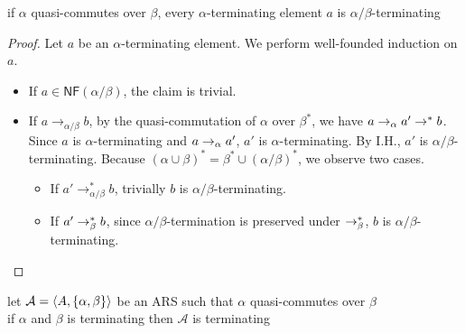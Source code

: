 \documentclass[12pt,aspectratio=169]{beamer}
\begin{document}
\newcommand{\abto}{\to_{\alpha/\beta}}

\begin{frame}
    \frametitle{}
    \begin{lemma}
        if $\alpha$ quasi-commutes over $\beta$,
        every $\alpha$-terminating element $a$ is $\alpha/\beta$-terminating
    \end{lemma}
    \pause
    \begin{proof}
        Let $a$ be an $\alpha$-terminating element.
        \pause
        We perform well-founded induction on $a$.
        \pause
        \begin{itemize}
            \item If $a \in \mathsf{NF}(\alpha/\beta)$, the claim is trivial.
            \pause
            \item If $a \abto b$, by the quasi-commutation of $\alpha$ over $\beta^*$, we have
            $a \to_{\alpha} a' \to^* b$.
            \pause Since $a$ is $\alpha$-terminating and $a \to_{\alpha} a'$,
            $a'$ is $\alpha$-terminating.
            \pause By I.H., $a'$ is $\alpha/\beta$-terminating.
            \pause
            Because $(\alpha \cup \beta)^* = \beta^* \cup (\alpha/\beta)^*$,
            we observe two cases.
            \begin{itemize}
                \pause
                \item If $a' \abto^* b$, trivially $b$ is $\alpha/\beta$-terminating.
                \pause
                \item If $a' \to_{\beta}^* b$, since $\alpha/\beta$-termination is preserved under $\to_{\beta}^*$,
                    $b$ is $\alpha/\beta$-terminating. 
            \end{itemize}
        \end{itemize}
    \end{proof}

\end{frame}

\begin{frame}
    \begin{corollary}
        let $\mathcal{A} = \langle A, \{\alpha,\beta\} \rangle$ be an ARS such that $\alpha$ quasi-commutes over $\beta$\\
        if $\alpha$ and $\beta$ is terminating then $\mathcal{A}$ is terminating
    \end{corollary}
\end{frame}
\end{document}
